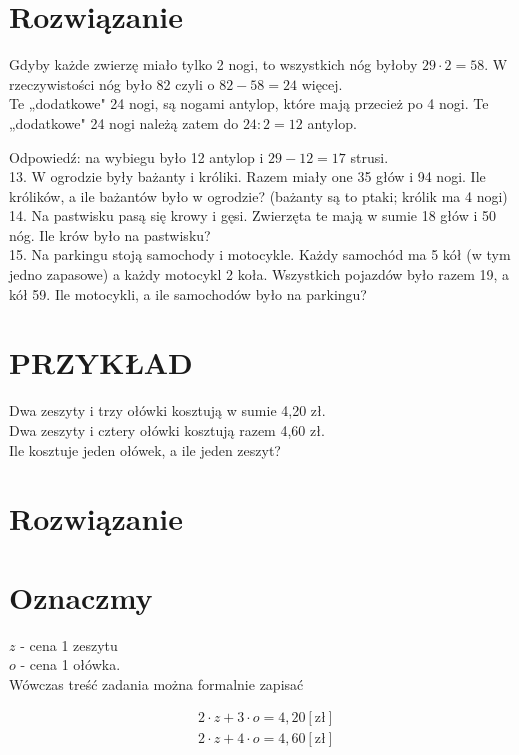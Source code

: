 \documentclass[10pt]{article}
\begin{document}
\section*{Rozwiązanie}
Gdyby każde zwierzę miało tylko 2 nogi, to wszystkich nóg byłoby \(29 \cdot 2=58\). W rzeczywistości nóg było 82 czyli o \(82-58=24\) więcej.\\
Te „dodatkowe" 24 nogi, są nogami antylop, które mają przecież po 4 nogi. Te „dodatkowe" 24 nogi należą zatem do \(24: 2=12\) antylop.

Odpowiedź: na wybiegu było 12 antylop i \(29-12=17\) strusi.\\
13. W ogrodzie były bażanty i króliki. Razem miały one 35 głów i 94 nogi. Ile królików, a ile bażantów było w ogrodzie? (bażanty są to ptaki; królik ma 4 nogi)\\
14. Na pastwisku pasą się krowy i gęsi. Zwierzęta te mają w sumie 18 głów i 50 nóg. Ile krów było na pastwisku?\\
15. Na parkingu stoją samochody i motocykle. Każdy samochód ma 5 kół (w tym jedno zapasowe) a każdy motocykl 2 koła. Wszystkich pojazdów było razem 19, a kół 59. Ile motocykli, a ile samochodów było na parkingu?

\section*{PRZYKŁAD}
Dwa zeszyty i trzy ołówki kosztują w sumie 4,20 zł.\\
Dwa zeszyty i cztery ołówki kosztują razem 4,60 zł.\\
Ile kosztuje jeden ołówek, a ile jeden zeszyt?

\section*{Rozwiązanie}
\section*{Oznaczmy}
\(z\) - cena 1 zeszytu\\
\(o\) - cena 1 ołówka.\\
Wówczas treść zadania można formalnie zapisać

\[
\begin{aligned}
& 2 \cdot z+3 \cdot o=4,20[\mathrm{zł}] \\
& 2 \cdot z+4 \cdot o=4,60[\mathrm{zł}]
\end{aligned}
\]
\end{document}
